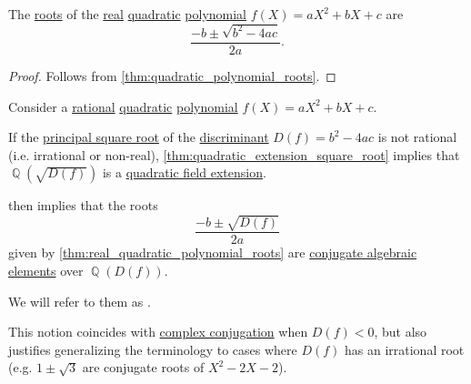 \begin{proposition}\label{thm:real_quadratic_polynomial_roots}
  The \hyperref[def:polynomial_root]{roots} of the \hyperref[def:real_numbers]{real} \hyperref[tab:def:polynomial_degree]{quadratic} \hyperref[def:polynomial_algebra]{polynomial} \( f(X) = a X^2 + b X + c \) are
  \begin{equation}\label{eq:def:conjugate_quadratic_roots}
    \frac {-b \pm \sqrt{b^2 - 4ac}} {2a}.
  \end{equation}
\end{proposition}
\begin{proof}
  Follows from \cref{thm:quadratic_polynomial_roots}.
\end{proof}

\begin{remark}\label{rem:conjugate_quadratic_roots}\mimprovised
  Consider a \hyperref[def:rational_numbers]{rational} \hyperref[tab:def:polynomial_degree]{quadratic} \hyperref[def:polynomial_algebra]{polynomial} \( f(X) = a X^2 + b X + c \).

  If the \hyperref[def:principal_real_square_root]{principal square root} of the \hyperref[def:discriminant]{discriminant} \( D(f) = b^2 - 4ac \) is not rational (i.e. irrational or non-real), \cref{thm:quadratic_extension_square_root} implies that \( \BbbQ(\sqrt{D(f)}) \) is a \hyperref[def:field_extension_degree]{quadratic field extension}.

   then implies that the roots
  \begin{equation*}
    \frac {-b \pm \sqrt{D(f)}} {2a}
  \end{equation*}
  given by \cref{thm:real_quadratic_polynomial_roots} are \hyperref[def:conjugate_algebraic_element]{conjugate algebraic elements} over \( \BbbQ(D(f)) \).

  We will refer to them as .
\end{remark}
\begin{comments}
  \item This notion coincides with \hyperref[def:complex_conjugation]{complex conjugation} when \( D(f) < 0 \), but also justifies generalizing the terminology to cases where \( D(f) \) has an irrational root (e.g. \( 1 \pm \sqrt 3 \) are conjugate roots of \( X^2 - 2X - 2 \)).
\end{comments}


